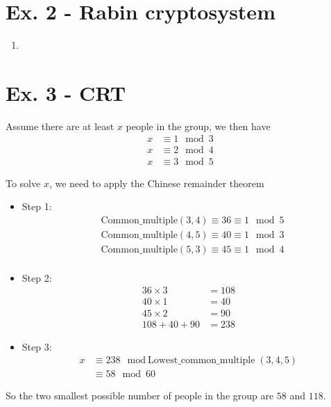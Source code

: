 \documentclass[11pt,a4paper]{article}
\begin{document}
\section*{Ex. 2 - Rabin cryptosystem}
\begin{enumerate}
	\item 
\end{enumerate}

\section*{Ex. 3 - CRT}
\par Assume there are at least $x$ people in the group, we then have\
	\begin{align*}
		x &\equiv 1 \mod 3 \\
		x &\equiv 2 \mod 4 \\
		x &\equiv 3 \mod 5
	\end{align*}
\par To solve $x$, we need to apply the Chinese remainder theorem
	\begin{itemize}
		\item Step 1:
			\begin{align*}
				&\mbox{Common\_multiple}(3, 4) \equiv 36 \equiv 1 \mod 5 \\
				&\mbox{Common\_multiple}(4, 5) \equiv 40 \equiv 1 \mod 3 \\
				&\mbox{Common\_multiple}(5, 3) \equiv 45 \equiv 1 \mod 4 \\
			\end{align*}
			
		\item Step 2:
			\begin{align*}
				36 \times 3 &= 108 \\
				40 \times 1 &= 40 \\
				45 \times 2 &= 90 \\
				108 + 40 + 90 &= 238
			\end{align*}
			
		\item Step 3:
			\begin{align*}
				x &\equiv 238 \mod \mbox{Lowest\_common\_multiple} (3, 4 , 5) \\
				&\equiv 58 \mod 60
			\end{align*}
	\end{itemize}
\par So the two smallest possible number of people in the group are $58$ and $118$.
\end{document}

